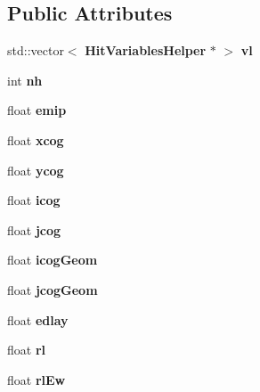 \subsection*{Public Attributes}
\begin{DoxyCompactItemize}
\item 
std\-::vector$<$ {\bf Hit\-Variables\-Helper} $\ast$ $>$ {\bfseries vl}\label{classCALICE_1_1LayerVariablesHelper_a72f7c2c14214c032f98eadce6372347a}

\item 
int {\bfseries nh}\label{classCALICE_1_1LayerVariablesHelper_aa862a18b4b2152282813173e43e8d961}

\item 
float {\bfseries emip}\label{classCALICE_1_1LayerVariablesHelper_a2bac9dc29f66fa678dc80930b9f20ba5}

\item 
float {\bfseries xcog}\label{classCALICE_1_1LayerVariablesHelper_af317805fde824747dde4e0ca26446be0}

\item 
float {\bfseries ycog}\label{classCALICE_1_1LayerVariablesHelper_a24aefaa7a82a2ab558df927bf93c22f4}

\item 
float {\bfseries icog}\label{classCALICE_1_1LayerVariablesHelper_af306b606e5f19bdb05286e00c0041ffd}

\item 
float {\bfseries jcog}\label{classCALICE_1_1LayerVariablesHelper_aab44dd027c49fac895662d71fd9edaef}

\item 
float {\bfseries icog\-Geom}\label{classCALICE_1_1LayerVariablesHelper_a05cc34b722005b0f75627a0415734869}

\item 
float {\bfseries jcog\-Geom}\label{classCALICE_1_1LayerVariablesHelper_a013a842729410e39f0d2d8f26c3afc4c}

\item 
float {\bfseries edlay}\label{classCALICE_1_1LayerVariablesHelper_abf436c7642cb41e6d1543422541a8756}

\item 
float {\bfseries rl}\label{classCALICE_1_1LayerVariablesHelper_a766cea8dc2fa8791cceb18817c76853a}

\item 
float {\bfseries rl\-Ew}\label{classCALICE_1_1LayerVariablesHelper_a8cb839989473dedd2405f35c82461c24}

\end{DoxyCompactItemize}


